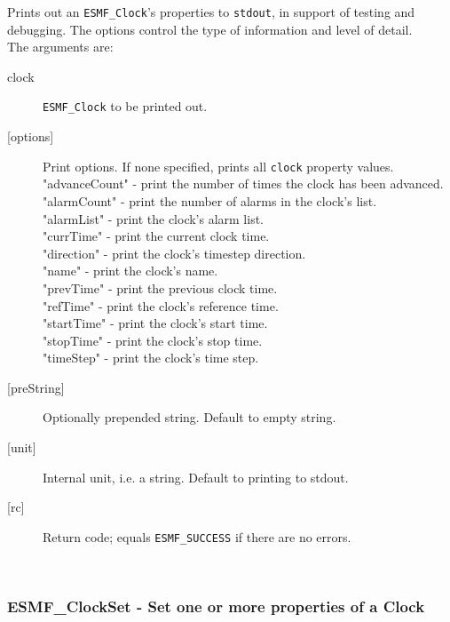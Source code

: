        Prints out an {\tt ESMF\_Clock}'s properties to {\tt stdout}, in
       support of testing and debugging.  The options control the type of
       information and level of detail. \\
  
       The arguments are:
       \begin{description}
       \item[clock]
            {\tt ESMF\_Clock} to be printed out.
       \item[{[options]}]
            Print options. If none specified, prints all {\tt clock} property
            values.\\
            "advanceCount" - print the number of times the clock has been
                             advanced. \\
            "alarmCount"   - print the number of alarms in the clock's list. \\
            "alarmList"    - print the clock's alarm list. \\
            "currTime"     - print the current clock time. \\
            "direction"    - print the clock's timestep direction. \\
            "name"         - print the clock's name. \\
            "prevTime"     - print the previous clock time. \\
            "refTime"      - print the clock's reference time. \\
            "startTime"    - print the clock's start time. \\
            "stopTime"     - print the clock's stop time. \\
            "timeStep"     - print the clock's time step. \\
       \item[{[preString]}]
            Optionally prepended string. Default to empty string.
       \item[{[unit]}]
            Internal unit, i.e. a string. Default to printing to stdout.
       \item[{[rc]}]
            Return code; equals {\tt ESMF\_SUCCESS} if there are no errors.
       \end{description}
   
 
\mbox{}\hrulefill\ 
 
\subsubsection [ESMF\_ClockSet] {ESMF\_ClockSet - Set one or more properties of a Clock}


